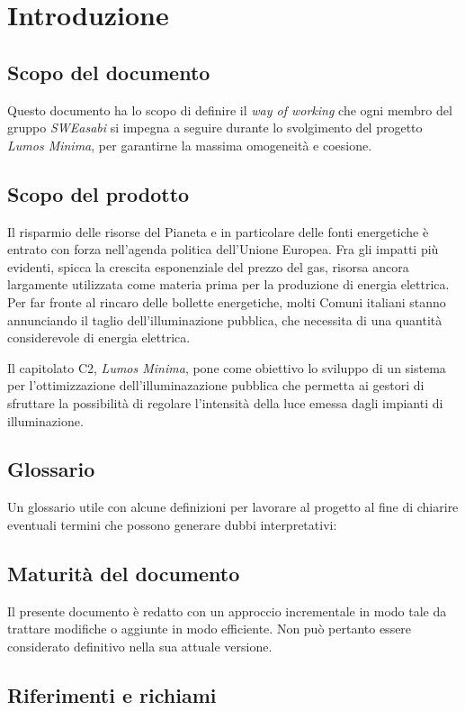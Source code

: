 \chapter{Introduzione}
\section{Scopo del documento}
Questo documento ha lo scopo di definire il \textit{way of working} che ogni membro del gruppo \textit{SWEasabi} si impegna a seguire durante lo svolgimento del progetto \textit{Lumos Minima}, per garantirne la massima omogeneità e coesione.

\section{Scopo del prodotto}
Il risparmio delle risorse del Pianeta e in particolare delle fonti energetiche è entrato con forza nell'agenda politica dell’Unione Europea. Fra gli impatti più evidenti, spicca la crescita esponenziale del prezzo del gas, risorsa ancora largamente utilizzata come materia prima per la produzione di energia elettrica.
Per far fronte al rincaro delle bollette energetiche, molti Comuni italiani stanno annunciando il taglio dell’illuminazione pubblica, che necessita di una quantità considerevole di energia elettrica.

Il capitolato C2, \textit{Lumos Minima}, pone come obiettivo lo sviluppo di un sistema per l'ottimizzazione dell'illuminazazione pubblica che permetta ai gestori di sfruttare la possibilità di regolare l'intensità della luce emessa dagli impianti di illuminazione.


\section{Glossario}
Un glossario utile con alcune definizioni per lavorare al progetto al fine di chiarire eventuali termini che possono generare dubbi interpretativi:

\section{Maturità del documento}
Il presente documento è redatto con un approccio incrementale in modo tale da trattare modifiche o aggiunte in modo efficiente. Non può pertanto essere considerato definitivo nella sua attuale versione.


\section{Riferimenti e richiami}
